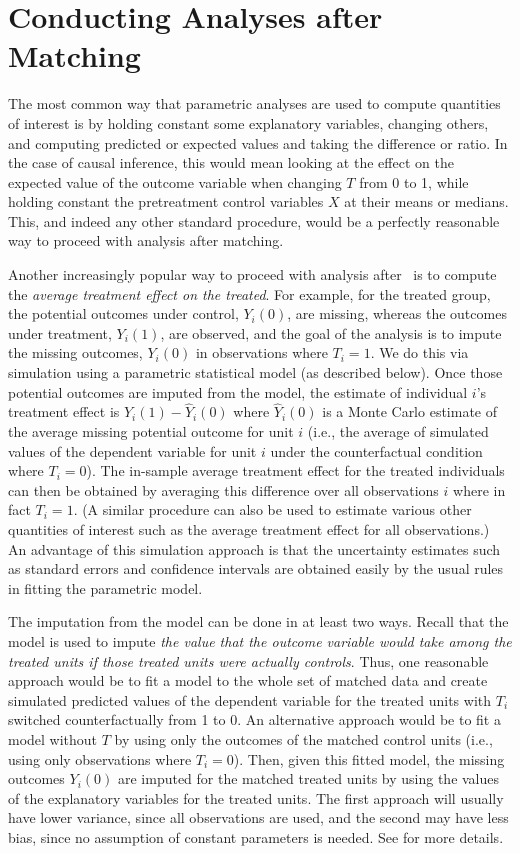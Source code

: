 \section{Conducting Analyses after Matching}

The most common way that parametric analyses are used to compute
quantities of interest is by holding constant some explanatory
variables, changing others, and computing predicted or expected values
and taking the difference or ratio.  In the case of causal inference,
this would mean looking at the effect on the expected value of the
outcome variable when changing $T$ from 0 to 1, while holding constant
the pretreatment control variables $X$ at their means or medians.
This, and indeed any other standard procedure, would be a perfectly
reasonable way to proceed with analysis after matching.

Another increasingly popular way to proceed with analysis after
\MatchIt\ is to compute the \emph{average treatment effect on the
  treated}.  For example, for the treated group, the potential
outcomes under control, $Y_i(0)$, are missing, whereas the outcomes
under treatment, $Y_i(1)$, are observed, and the goal of the analysis
is to impute the missing outcomes, $Y_i(0)$ in observations where
$T_i=1$.  We do this via simulation using a parametric statistical
model (as described below).  Once those potential outcomes are imputed
from the model, the estimate of individual $i$'s treatment effect is
$Y_i(1)-\widehat{Y}_i(0)$ where $\widehat{Y}_i(0)$ is a Monte Carlo
estimate of the average missing potential outcome for unit $i$ (i.e.,
the average of simulated values of the dependent variable for unit $i$
under the counterfactual condition where $T_i=0$).  The in-sample
average treatment effect for the treated individuals can then be
obtained by averaging this difference over all observations $i$ where
in fact $T_i=1$.  (A similar procedure can also be used to estimate
various other quantities of interest such as the average treatment
effect for all observations.)  An advantage of this simulation
approach is that the uncertainty estimates such as standard errors and
confidence intervals are obtained easily by the usual rules in fitting
the parametric model.

The imputation from the model can be done in at least two ways.
Recall that the model is used to impute \emph{the value that the
  outcome variable would take among the treated units if those treated
  units were actually controls}.  Thus, one reasonable approach would
be to fit a model to the whole set of matched data and create
simulated predicted values of the dependent variable for the treated
units with $T_i$ switched counterfactually from 1 to 0.  An
alternative approach would be to fit a model without $T$ by using only
the outcomes of the matched control units (i.e., using only
observations where $T_i=0$).  Then, given this fitted model, the
missing outcomes $Y_i(0)$ are imputed for the matched treated units by
using the values of the explanatory variables for the treated units.
The first approach will usually have lower variance, since all
observations are used, and the second may have less bias, since no
assumption of constant parameters is needed.  See \citet*{HoImaKin05}
for more details.

